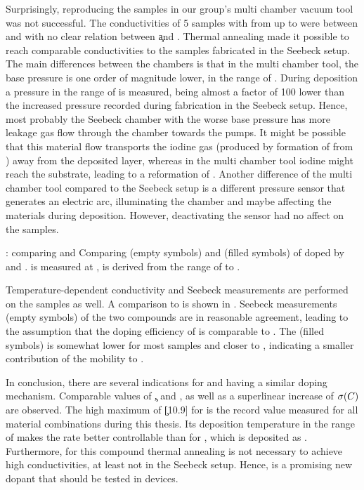 Surprisingly, reproducing the samples in our group's multi chamber vacuum tool was not successful. The conductivities of 5 samples with \CLongs from \C[0.150] up to  were between  and  with no clear relation between \c and \C. Thermal annealing made it possible to reach comparable conductivities to the samples fabricated in the Seebeck setup. The main differences between the chambers is that in the multi chamber tool, the base pressure is one order of magnitude lower, in the range of . During deposition a pressure in the range of  is measured, being almost a factor of 100 lower than the increased pressure recorded during fabrication in the Seebeck setup.
Hence, most probably the Seebeck chamber with the worse base pressure has more leakage gas flow through the chamber towards the pumps. It might be possible that this material flow transports the iodine gas (produced by formation of \meodmbi from \meodmbiI) away from the deposited layer, whereas in the multi chamber tool iodine might reach the substrate, leading to a reformation of \meodmbiI.
Another difference of the multi chamber tool compared to the Seebeck setup is a different pressure sensor that generates an electric arc, illuminating the chamber and maybe affecting the materials during deposition. However, deactivating the sensor had no affect on the samples.

{\meodmbiI \vs \dmbi: comparing \Es and \Eact}
{Comparing \EsLongL (empty symbols) and \EactLongL (filled symbols) of \CS doped by \meodmbiI and \dmbi. \Es is measured at \Tm[40], \Eact is derived from the range of \T[25] to .}

Temperature-dependent conductivity and Seebeck measurements are performed on the \meodmbiI samples as well. A comparison to \dmbi is shown in . Seebeck measurements (empty symbols) of the two compounds are in reasonable agreement, leading to the assumption that the doping efficiency of \meodmbiI is comparable to \dmbi. The \EactLong \Eact (filled symbols) is somewhat lower for most \meodmbiI samples and closer to \Es, indicating a smaller contribution of the mobility to \Eact.

In conclusion, there are several indications for \meodmbiI and \dmbi having a similar doping mechanism. Comparable values of \c, \Es and \Eact, as well as a superlinear increase of $\c(\C)$ are observed. The high maximum of \c[10.9] for \meodmbiI is the record value measured for all material combinations during this thesis. Its deposition temperature in the range of \Tdep[185] makes the rate better controllable than for \dmbi, which is deposited as \Tdep[110]. Furthermore,  for this compound thermal annealing is not necessary to achieve high conductivities, at least not in the Seebeck setup. Hence, \meodmbiI is a promising new dopant that should be tested in devices.

